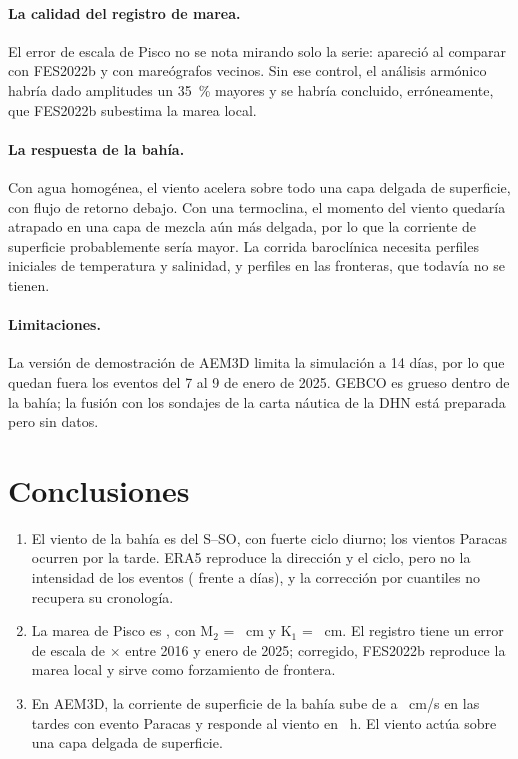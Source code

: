 \documentclass[11pt,a4paper]{article}
\begin{document}
\paragraph{La calidad del registro de marea.} El error de escala de Pisco no se nota mirando solo la serie:
apareció al comparar con FES2022b y con mareógrafos vecinos. Sin ese control, el análisis armónico habría dado
amplitudes un 35~\% mayores y se habría concluido, erróneamente, que FES2022b subestima la marea local.

\paragraph{La respuesta de la bahía.} Con agua homogénea, el viento acelera sobre todo una capa delgada de
superficie, con flujo de retorno debajo. Con una termoclina, el momento del viento quedaría atrapado en una capa
de mezcla aún más delgada, por lo que la corriente de superficie probablemente sería mayor. La corrida baroclínica
necesita perfiles iniciales de temperatura y salinidad, y perfiles en las fronteras, que todavía no se tienen.

\paragraph{Limitaciones.} La versión de demostración de AEM3D limita la simulación a 14 días, por lo que quedan
fuera los eventos del 7 al 9 de enero de 2025. GEBCO es grueso dentro de la bahía; la fusión con los sondajes de
la carta náutica de la DHN está preparada pero sin datos.

\section{Conclusiones}

\begin{enumerate}
  \item El viento de la bahía es del S--SO, con fuerte ciclo diurno; los vientos Paracas ocurren por la tarde.
    ERA5 reproduce la dirección y el ciclo, pero no la intensidad de los eventos (\eventosEra{} frente a
    \eventosMetar{} días), y la corrección por cuantiles no recupera su cronología.
  \item La marea de Pisco es \claseMarea, con M$_2$ = \ampMdos~cm y K$_1$ = \ampKuno~cm. El registro tiene un
    error de escala de $\times$\razonError{} entre 2016 y enero de 2025; corregido, FES2022b reproduce la marea
    local y sirve como forzamiento de frontera.
  \item En AEM3D, la corriente de superficie de la bahía sube de \corrCalma{} a \corrEvento~cm/s en las tardes
    con evento Paracas y responde al viento en \rezagoVientoCorr~h. El viento actúa sobre una capa delgada de
    superficie.
\end{enumerate}
\end{document}
